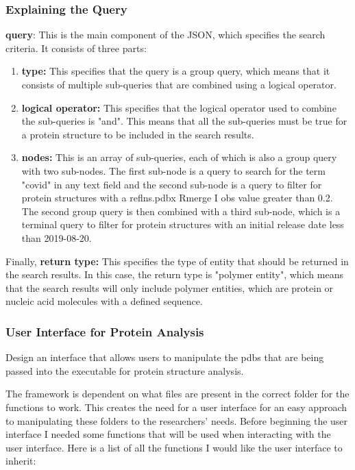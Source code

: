 \documentclass[]{final_report}
\begin{document}
\clearpage

\subsubsection{Explaining the Query}

\textbf{query}: This is the main component of the JSON, which specifies the search criteria. It consists of three parts:

\begin{enumerate}
    \item \textbf{type:} This specifies that the query is a group query, which means that it consists of multiple sub-queries that are combined using a logical operator.
    \item \textbf{logical operator:} This specifies that the logical operator used to combine the sub-queries is "and". This means that all the sub-queries must be true for a protein structure to be included in the search results.
    \item \textbf{nodes:} This is an array of sub-queries, each of which is also a group query with two sub-nodes. The first sub-node is a query to search for the term "covid" in any text field and the second sub-node is a query to filter for protein structures with a reflns.pdbx Rmerge I obs value greater than 0.2. The second group query is then combined with a third sub-node, which is a terminal query to filter for protein structures with an initial release date less than 2019-08-20.
\end{enumerate}

Finally, \textbf{return type:} This specifies the type of entity that should be returned in the search results. In this case, the return type is "polymer entity", which means that the search results will only include polymer entities, which are protein or nucleic acid molecules with a defined sequence.
\clearpage

\subsubsection{User Interface for Protein Analysis}
\begin{displayquote}
    Design an interface that allows users to manipulate the pdbs that are being passed into
    the executable for protein structure analysis.
\end{displayquote}

The framework is dependent on what files are present in the correct folder for the functions to work. This creates the need for a user interface for an easy approach to manipulating these folders to the researchers' needs. Before beginning the user interface I needed some functions that will be used when interacting with the user interface. Here is a list of all the functions I would like the user interface to inherit:
\end{document}
